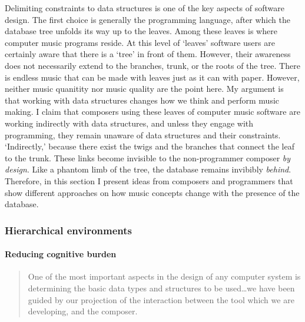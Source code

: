 Delimiting constraints to data structures is one of the key aspects of software design. The first choice is generally the programming language, after which the database tree unfolds its way up to the leaves. Among these leaves is where computer music programs reside. At this level of `leaves' software users are certainly aware that there is a `tree' in front of them. However, their awareness does not necessarily extend to the branches, trunk, or the roots of the tree. There is endless music that can be made with leaves just as it can with paper. However, neither music quanitity nor music quality are the point here. My argument is that working with data structures changes how we think and perform music making. I claim that composers using these leaves of computer music software are working indirectly with data structures, and unless they engage with programming, they remain unaware of data structures and their constraints. `Indirectly,' because there exist the twigs and the branches that connect the leaf to the trunk. These links become invisible to the non-programmer composer \textit{by design}. Like a phantom limb of the tree, the database remains invibibly \textit{behind}. Therefore, in this section I present ideas from composers and programmers that show different approaches on how music concepts change with the presence of the database. 


\subsubsection{Hierarchical environments}

	\paragraph{Reducing cognitive burden}
	\label{computer:sssp}

	\begin{quote}
		One of the most important aspects in the design of any computer system is determining the basic data types and structures to be used\dots we have been guided by our projection of the interaction between the tool which we are developing, and the composer. \parencite[119]{icmc/bbp2372.1978.012}
	\end{quote}

